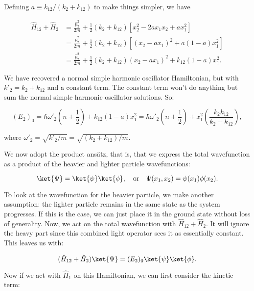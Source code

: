 Defining $a \equiv k_{12}/(k_2 + k_{12})$ to make things simpler, we have

\begin{align}
  \hat{H}_{12} + \hat{H}_2 &= \frac{\hat{p}_2^2}{2m} + \frac{1}{2}(k_2 + k_{12})\left[ x_2^2 - 2ax_1x_2 + ax_1^2 \right] \\
                           &= \frac{\hat{p}_2^2}{2m} + \frac{1}{2}(k_2 + k_{12})\left[ (x_2 - ax_1)^2 + a(1-a)x_1^2 \right] \\
                           &= \frac{\hat{p}_2^2}{2m} + \frac{1}{2}(k_2 + k_{12})(x_2 - ax_1)^2 + k_{12}(1-a)x_1^2.
\end{align}

We have recovered a normal simple harmonic oscillator Hamiltonian, but with $k'_2 = k_2 + k_{12}$ and a constant term. The constant term won't do anything but sum the normal simple harmonic oscillator solutions. So:

\begin{equation}
  (E_2)_0 = \hbar\omega'_2\left( n + \frac{1}{2} \right) + k_{12}(1-a)x_1^2 = \hbar\omega'_2\left( n + \frac{1}{2} \right) + x_1^2\left( \frac{k_2k_{12}}{k_2 + k_{12}} \right),
\end{equation}

where $\omega'_2 = \sqrt{k'_2/m} = \sqrt{(k_2 + k_{12})/m}$.

We now adopt the product ans\"atz, that is, that we express the total wavefunction as a product of the heavier and lighter particle wavefunctions:

\begin{equation}
  \ket{\Psi} = \ket{\psi}\ket{\phi}, \quad\text{or}\quad \Psi(x_1,x_2) = \psi(x_1)\phi(x_2).
\end{equation}

To look at the wavefunction for the heavier particle, we make another assumption: the lighter particle remains in the same state as the system progresses. If this is the case, we can just place it in the ground state without loss of generality. Now, we act on the total wavefunction with $\hat{H}_{12} + \hat{H}_2$. It will ignore the heavy part since this combined light operator sees it as essentially constant. This leaves us with:

\begin{equation}
  (\hat{H}_{12} + \hat{H}_2)\ket{\Psi} = (E_2)_0\ket{\psi}\ket{\phi}.
\end{equation}

Now if we act with $\hat{H}_1$ on this Hamiltonian, we can first consider the kinetic term:

